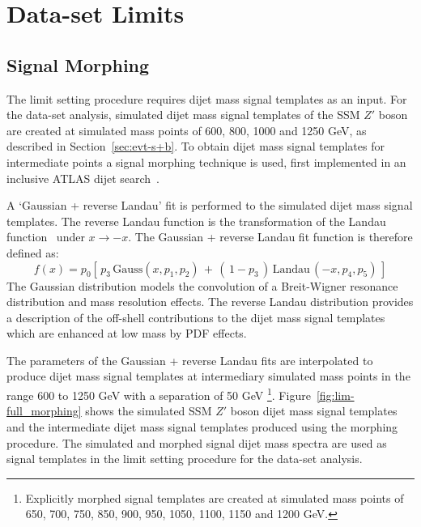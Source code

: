 \FloatBarrier

\section{\lm{} Data-set Limits}
\label{sec:lim-full}

\subsection{Signal Morphing}
\label{sec:lim-full_morphing}

The limit setting procedure requires dijet mass signal templates as an input.
For the \lm{} data-set analysis, simulated dijet mass signal templates of the SSM $Z'$ boson are created at simulated mass points of
600, 800, 1000 and 1250 GeV, as described in Section~\ref{sec:evt-s+b}.
To obtain dijet mass signal templates for intermediate points a signal morphing technique is used,
first implemented in an inclusive ATLAS dijet search~\cite{dijet-mori17_paper}.

A `Gaussian + reverse Landau' fit is performed to the simulated dijet mass signal templates.
The reverse Landau function is the transformation of the Landau function~\cite{lim-landau} under $x\to-x$.
The Gaussian + reverse Landau fit function is therefore defined as:
\begin{equation}
  f(x)=p_0 \left[ \,p_3\,\mathrm{Gauss}\left(x,p_1,p_2\right)\,+\,\left(\,1-p_3\,\right)\,\mathrm{Landau}\,\left(-x,p_4,p_5\right)\, \right]
\end{equation}
The Gaussian distribution models the convolution of a Breit-Wigner resonance distribution and mass resolution effects.
The reverse Landau distribution provides a description of the off-shell contributions to the dijet mass signal templates which are enhanced at low mass by PDF effects.

The parameters of the Gaussian + reverse Landau fits are interpolated to produce dijet mass signal templates at intermediary simulated mass points
in the range 600 to 1250 GeV with a separation of 50 GeV
\footnote{Explicitly morphed signal templates are created at simulated mass points of
  650, 700, 750, 850, 900, 950, 1050, 1100, 1150 and 1200 GeV.}.
Figure~\ref{fig:lim-full_morphing} shows the simulated SSM $Z'$ boson dijet mass signal templates and the intermediate dijet mass signal templates produced using the morphing procedure.
The simulated and morphed signal dijet mass spectra are used as signal templates in the limit setting procedure for the \lm{} data-set analysis.
  
